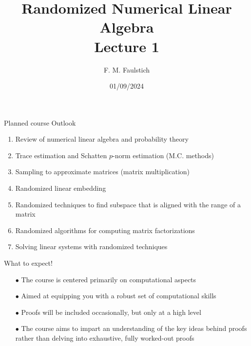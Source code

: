 \documentclass{beamer}
\title{
Randomized Numerical Linear Algebra\\
Lecture 1
}
\author{F. M. Faulstich}
\date{01/09/2024}
\begin{document}
\frame{\titlepage}

\begin{frame}{}
    
\end{frame}


\begin{frame}{Planned course Outlook}

\begin{enumerate}
    \item Review of numerical linear algebra and probability theory
    \item Trace estimation and Schatten $p$-norm estimation (M.C. methods)
    \item Sampling to approximate matrices (matrix multiplication)
    \item Randomized linear embedding
    \item Randomized techniques to find subspace
that is aligned with the range of a matrix 
    \item Randomized algorithms for computing matrix factorizations
    \item Solving linear systems with randomized techniques
\end{enumerate}

\end{frame}

\begin{frame}{What to expect!}

\begin{itemize}
    \item[$\bullet$] The course is centered primarily on computational aspects
    \item[$\bullet$] Aimed at equipping you with a robust set of computational skills
    \item[$\bullet$] Proofs will be included occasionally, but only at a high level
    \item[$\bullet$] The course aims to impart an understanding of the key ideas behind proofs rather than delving into exhaustive, fully worked-out proofs
\end{itemize}

\end{frame}
\end{document}
